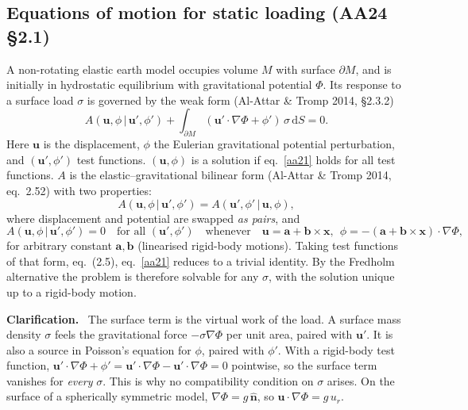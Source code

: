 \documentclass[11pt,a4paper]{article}
\newcommand{\bx}{\mathbf{x}}
\newcommand{\bu}{\mathbf{u}}
\newcommand{\ba}{\mathbf{a}}
\newcommand{\bb}{\mathbf{b}}
\newcommand{\bn}{\hat{\mathbf{n}}}
\newcommand{\dd}{\,\mathrm{d}}
\newcommand{\pM}{\partial M}
\renewenvironment{leftbar}{%
  \def\FrameCommand{{\color{clarbar}\vrule width 2.5pt}\hspace{8pt}}%
  \MakeFramed{\advance\hsize-\width\FrameRestore}}%
  {\endMakeFramed}
\newenvironment{clar}{\begin{leftbar}\small\noindent\textbf{Clarification.}\ }{\end{leftbar}}
\begin{document}
\subsection{Equations of motion for static loading (AA24 \S2.1)}

A non-rotating elastic earth model occupies volume $M$ with surface $\pM$, and is initially in
hydrostatic equilibrium with gravitational potential $\Phi$. Its response to a surface load
$\sigma$ is governed by the weak form (Al-Attar \& Tromp 2014, \S2.3.2)
\begin{equation}
  A(\bu,\phi\,|\,\bu',\phi')+\int_{\pM}(\bu'\cdot\nabla\Phi+\phi')\,\sigma\dd S=0 .
  \tag{2.1}\label{aa21}
\end{equation}
Here $\bu$ is the displacement, $\phi$ the Eulerian gravitational potential perturbation, and
$(\bu',\phi')$ test functions. $(\bu,\phi)$ is a solution if eq.~\eqref{aa21} holds for all test
functions. $A$ is the elastic--gravitational bilinear form (Al-Attar \& Tromp 2014, eq.~2.52) with
two properties:
\begin{equation}
  A(\bu,\phi\,|\,\bu',\phi')=A(\bu',\phi'\,|\,\bu,\phi),
  \tag{2.2}\label{aa22}
\end{equation}
where displacement and potential are swapped \emph{as pairs}, and
\begin{equation}
  A(\bu,\phi\,|\,\bu',\phi')=0 \quad\text{for all }(\bu',\phi')\quad\text{whenever}\quad
  \bu=\ba+\bb\times\bx,\ \ \phi=-(\ba+\bb\times\bx)\cdot\nabla\Phi,
  \tag{2.3--2.4}\label{aa24}
\end{equation}
for arbitrary constant $\ba,\bb$ (linearised rigid-body motions). Taking test functions of that
form, eq.~(2.5), eq.~\eqref{aa21} reduces to a trivial identity. By the Fredholm alternative the
problem is therefore solvable for any $\sigma$, with the solution unique up to a rigid-body motion.

\begin{clar}
The surface term is the virtual work of the load. A surface mass density $\sigma$ feels the
gravitational force $-\sigma\nabla\Phi$ per unit area, paired with $\bu'$. It is also a source in
Poisson's equation for $\phi$, paired with $\phi'$. With a rigid-body test function,
$\bu'\cdot\nabla\Phi+\phi'=\bu'\cdot\nabla\Phi-\bu'\cdot\nabla\Phi=0$ pointwise, so the surface term
vanishes for \emph{every} $\sigma$. This is why no compatibility condition on $\sigma$ arises. On
the surface of a spherically symmetric model, $\nabla\Phi=g\,\bn$, so
$\bu\cdot\nabla\Phi=g\,u_r$.
\end{clar}
\end{document}
